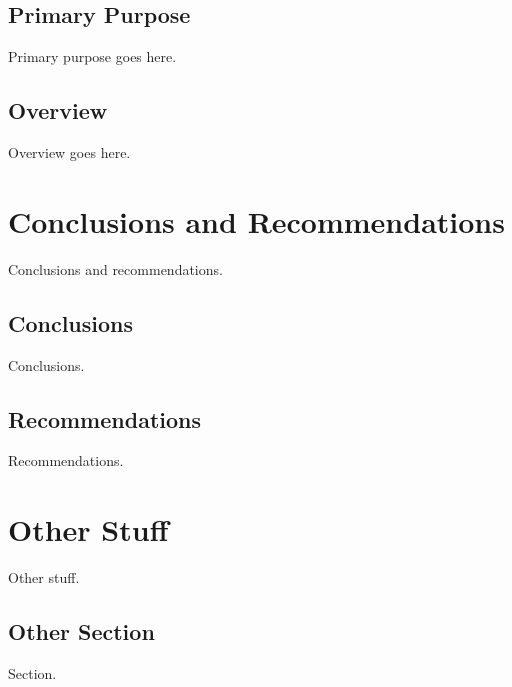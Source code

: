 \documentclass{kuthesis}
\begin{document}
\section{Primary Purpose}
Primary purpose goes here.
\section{Overview}
Overview goes here.

\chapter{Conclusions and Recommendations}
Conclusions and recommendations.
\section{Conclusions}
Conclusions.
\section{Recommendations}
Recommendations.

\chapter{Other Stuff}
Other stuff.
\section{Other Section}
Section.
\end{document}
